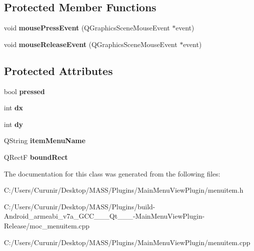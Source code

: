 \subsection*{Protected Member Functions}
\begin{DoxyCompactItemize}
\item 
\mbox{\label{class_menu_item_graphics_object_a6f291090f45fc75a171ae55a09fd4f3d}} 
void {\bfseries mouse\+Press\+Event} (Q\+Graphics\+Scene\+Mouse\+Event $\ast$event)
\item 
\mbox{\label{class_menu_item_graphics_object_addbf1e6b7247679ccf8b31f6a885f6e6}} 
void {\bfseries mouse\+Release\+Event} (Q\+Graphics\+Scene\+Mouse\+Event $\ast$event)
\end{DoxyCompactItemize}
\subsection*{Protected Attributes}
\begin{DoxyCompactItemize}
\item 
\mbox{\label{class_menu_item_graphics_object_ac8a4aab9ad0917b4f4270225a7ecbb58}} 
bool {\bfseries pressed}
\item 
\mbox{\label{class_menu_item_graphics_object_aba38dc2a531e530d08f2aa92544f3104}} 
int {\bfseries dx}
\item 
\mbox{\label{class_menu_item_graphics_object_a9b7f14de2c2e5ff71aad8a6ab729ef1d}} 
int {\bfseries dy}
\item 
\mbox{\label{class_menu_item_graphics_object_a6ed305de3a3718503a5e3dabdbc07786}} 
Q\+String {\bfseries item\+Menu\+Name}
\item 
\mbox{\label{class_menu_item_graphics_object_ae78d7732b7108406484238c3814bb1e6}} 
Q\+RectF {\bfseries bound\+Rect}
\end{DoxyCompactItemize}


The documentation for this class was generated from the following files\+:\begin{DoxyCompactItemize}
\item 
C\+:/\+Users/\+Curunir/\+Desktop/\+M\+A\+S\+S/\+Plugins/\+Main\+Menu\+View\+Plugin/menuitem.\+h\item 
C\+:/\+Users/\+Curunir/\+Desktop/\+M\+A\+S\+S/\+Plugins/build-\/\+Android\+\_\+armeabi\+\_\+v7a\+\_\+\+G\+C\+C\+\_\+\_\+\_\+\+Qt\+\_\+\_\+\_-\/\+Main\+Menu\+View\+Plugin-\/\+Release/moc\+\_\+menuitem.\+cpp\item 
C\+:/\+Users/\+Curunir/\+Desktop/\+M\+A\+S\+S/\+Plugins/\+Main\+Menu\+View\+Plugin/menuitem.\+cpp\end{DoxyCompactItemize}
